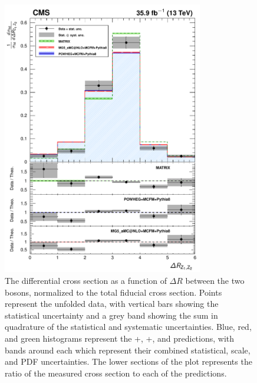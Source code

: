 \begin{figure}[htbp]
  \begin{center}
    \includegraphics[width=0.78\textwidth]{results/unfold_deltaRZZ.pdf}
    \caption[Normalized differential {\ZZ} cross section as a function of $\Delta R$ between the {\PZ} bosons]{
        The {\ZZ} differential cross section as a function of $\Delta R$ between the two {\PZ} bosons, normalized to the total fiducial cross section.
        Points represent the unfolded data, with vertical bars showing the statistical uncertainty and a grey band showing the sum in quadrature of the statistical and systematic uncertainties.
        Blue, red, and green histograms represent the {\POWHEG}+{\MCFM}, {\MGAMC}+{\MCFM}, and {\MATRIX} predictions, with bands around each which represent their combined statistical, scale, and PDF uncertainties.
        The lower sections of the plot represents the ratio of the measured cross section to each of the predictions.
      }\label{fig:unfold_deltaRZZ}
  \end{center}
\end{figure}

